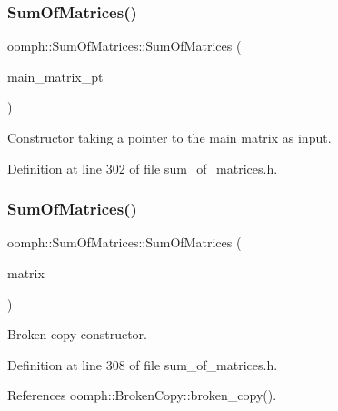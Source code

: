 \subsubsection{\texorpdfstring{Sum\+Of\+Matrices()}{SumOfMatrices()}\hspace{0.1cm}{\footnotesize\ttfamily [2/3]}}
{\footnotesize\ttfamily oomph\+::\+Sum\+Of\+Matrices\+::\+Sum\+Of\+Matrices (\begin{DoxyParamCaption}\item[{\hyperlink{classoomph_1_1DoubleMatrixBase}{Double\+Matrix\+Base} $\ast$}]{main\+\_\+matrix\+\_\+pt }\end{DoxyParamCaption})\hspace{0.3cm}{\ttfamily [inline]}}



Constructor taking a pointer to the main matrix as input. 



Definition at line 302 of file sum\+\_\+of\+\_\+matrices.\+h.

\mbox{\label{classoomph_1_1SumOfMatrices_ab539b15fa9a116675e5423187f9019aa}} 
\subsubsection{\texorpdfstring{Sum\+Of\+Matrices()}{SumOfMatrices()}\hspace{0.1cm}{\footnotesize\ttfamily [3/3]}}
{\footnotesize\ttfamily oomph\+::\+Sum\+Of\+Matrices\+::\+Sum\+Of\+Matrices (\begin{DoxyParamCaption}\item[{const \hyperlink{classoomph_1_1SumOfMatrices}{Sum\+Of\+Matrices} \&}]{matrix }\end{DoxyParamCaption})\hspace{0.3cm}{\ttfamily [inline]}}



Broken copy constructor. 



Definition at line 308 of file sum\+\_\+of\+\_\+matrices.\+h.



References oomph\+::\+Broken\+Copy\+::broken\+\_\+copy().

\mbox{\label{classoomph_1_1SumOfMatrices_af6cc954e345acc8587bf861d92a678fc}} 
